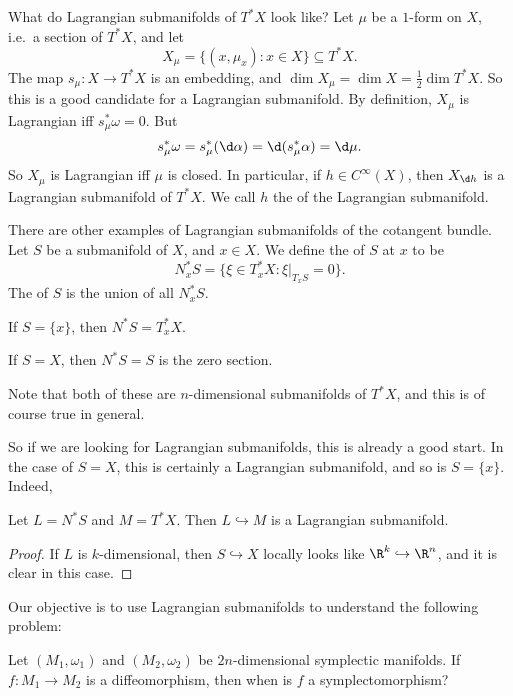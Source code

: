 \documentclass[a4paper]{article}
\begin{document}
What do Lagrangian submanifolds of $T^* X$ look like? Let $\mu$ be a $1$-form on $X$, i.e.\ a section of $T^* X$, and let
\[
  X_\mu = \{(x, \mu_x): x \in X\} \subseteq T^* X.
\]
The map $s_\mu: X \to T^*X$ is an embedding, and $\dim X_\mu = \dim X = \frac{1}{2} \dim T^* X$. So this is a good candidate for a Lagrangian submanifold. By definition, $X_\mu$ is Lagrangian iff $s_\mu^* \omega = 0$. But
\[
  s_\mu^* \omega = s_\mu^* (\d \alpha) = \d (s_\mu^* \alpha) = \d \mu.
\]
So $X_\mu$ is Lagrangian iff $\mu$ is closed. In particular, if $h \in C^\infty(X)$, then $X_{\d h}$ is a Lagrangian submanifold of $T^* X$. We call $h$ the  of the Lagrangian submanifold.

There are other examples of Lagrangian submanifolds of the cotangent bundle. Let $S$ be a submanifold of $X$, and $x \in X$. We define the  of $S$ at $x$ to be
\[
  N_x^* S = \{\xi \in T_x^* X : \xi|_{T_x S} = 0\}.
\]
The  of $S$ is the union of all $N^*_x S$.

\begin{eg}
  If $S = \{x\}$, then $N^*S = T^*_x X$.
\end{eg}

\begin{eg}
  If $S = X$, then $N^*S = S$ is the zero section.
\end{eg}

Note that both of these are $n$-dimensional submanifolds of $T^*X$, and this is of course true in general.

So if we are looking for Lagrangian submanifolds, this is already a good start. In the case of $S = X$, this is certainly a Lagrangian submanifold, and so is $S = \{x\}$. Indeed,
\begin{prop}
  Let $L = N^* S$ and $M = T^* X$. Then $L \hookrightarrow M$ is a Lagrangian submanifold.
\end{prop}

\begin{proof}
  If $L$ is $k$-dimensional, then $S \hookrightarrow X$ locally looks like $\R^k \hookrightarrow \R^n$, and it is clear in this case.
\end{proof}

Our objective is to use Lagrangian submanifolds to understand the following problem:
\begin{problem}
  Let $(M_1, \omega_1)$ and $(M_2, \omega_2)$ be $2n$-dimensional symplectic manifolds. If $f: M_1 \to M_2$ is a diffeomorphism, then when is $f$ a symplectomorphism?
\end{problem}
\end{document}
